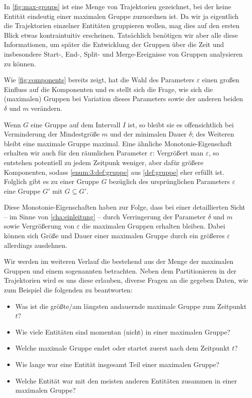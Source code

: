 In \cref{fig:max-groups} ist eine Menge von Trajektorien gezeichnet, bei der keine Entität eindeutig einer maximalen Gruppe zuzuordnen ist.
Da wir ja eigentlich die Trajektorien einzelner Entitäten gruppieren wollen, mag dies auf den ersten Blick etwas kontraintuitiv erscheinen.
Tatsächlich benötigen wir aber alle diese Informationen, um später die Entwicklung der Gruppen über die Zeit und insbesondere Start-, End-, Split- und Merge-Ereignisse von Gruppen analysieren zu können.

Wie \cref{fig:components} bereits zeigt, hat die Wahl des Parameters $\varepsilon$ einen großen Einfluss auf die Komponenten und es stellt sich die Frage, wie sich die (maximalen) Gruppen bei Variation dieses Parameters sowie der anderen beiden $\delta$ und $m$ verändern.

Wenn $G$ eine Gruppe auf dem Intervall $I$ ist, so bleibt sie es offensichtlich bei Verminderung der Mindestgröße $m$ und der minimalen Dauer $\delta$; des Weiteren bleibt eine maximale Gruppe maximal. 
Eine ähnliche Monotonie-Eigenschaft erhalten wir auch für den räumlichen Parameter $\varepsilon$:
Vergrößert man $\varepsilon$, so entstehen potentiell zu jedem Zeitpunk weniger, aber dafür größere Komponenten, sodass \cref{enum:3:def:gruppe} aus \cref{def:gruppe} eher erfüllt ist.
Folglich gibt es zu einer Gruppe $G$ bezüglich des ursprünglichen Parameters $\varepsilon$ eine Gruppe $G'$ mit $G \subseteq G'$.

Diese Monotonie-Eigenschaften haben zur Folge, dass bei einer detaillierten Sicht -- im Sinne von \cref{cha:einleitung} -- durch Verringerung der Parameter $\delta$ und $m$ sowie Vergrößerung von $\varepsilon$ die maximalen Gruppen erhalten bleiben.
Dabei können sich Größe und Dauer einer maximalen Gruppe durch ein größeres $\varepsilon$ allerdings ausdehnen.

Wir werden im weiteren Verlauf die \Index{\GrpStruktur} bestehend aus der Menge der maximalen Gruppen und einem sogenannten  betrachten.
Neben dem Partitionieren in der Trajektorien wird es uns diese \GrpStruktur erlauben, diverse Fragen an die gegeben Daten, wie zum Beispiel die folgenden zu beantworten:
\begin{itemize}
	\item Was ist die größte/am längsten andauernde maximale Gruppe zum Zeitpunkt $t$?
	\item Wie viele Entitäten sind momentan (nicht) in einer maximalen Gruppe?
	\item Welche maximale Gruppe endet oder startet zuerst nach dem Zeitpunkt $t$?
	\item Wie lange war eine Entität insgesamt Teil einer maximalen Gruppe?
	\item Welche Entität war mit den meisten anderen Entitäten zusammen in einer maximalen Gruppe?
\end{itemize}

